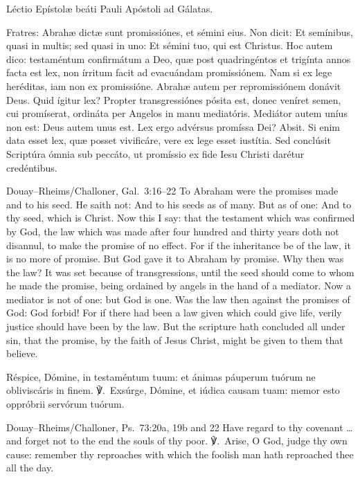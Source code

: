 Léctio Epístolæ beáti Pauli Apóstoli ad Gálatas.

Fratres: Abrahæ dictæ sunt promissiónes, et sémini eius. Non dicit: Et
semínibus, quasi in multis; sed quasi in uno: Et sémini tuo, qui est Christus.
Hoc autem dico: testaméntum confirmátum a Deo, quæ post quadringéntos et
trigínta annos facta est lex, non írritum facit ad evacuándam promissiónem.
Nam si ex lege heréditas, iam non ex promissióne. Abrahæ autem per
repromissiónem donávit Deus. Quid ígitur lex? Propter transgressiónes pósita
est, donec veníret semen, cui promíserat, ordináta per Angelos in manu
mediatóris. Mediátor autem uníus non est: Deus autem unus est. Lex ergo
advérsus promíssa Dei? Absit. Si enim data esset lex, quæ posset vivificáre,
vere ex lege esset iustítia. Sed conclúsit Scriptúra ómnia sub peccáto, ut
promíssio ex fide Iesu Christi darétur credéntibus.
\finishfulltextelement
\begin{fulltextenglish}{Douay--Rheims/Challoner, Gal.~3:16--22}
To Abraham were the promises made and to his seed. He saith not: And to his
seeds as of many. But as of one: And to thy seed, which is Christ. Now this I
say: that the testament which was confirmed by God, the law which was made
after four hundred and thirty years doth not disannul, to make the promise of
no effect. For if the inheritance be of the law, it is no more of promise.
But God gave it to Abraham by promise. Why then was the law? It was set
because of transgressions, until the seed should come to whom he made the
promise, being ordained by angels in the hand of a mediator. Now a mediator is
not of one: but God is one. Was the law then against the promises of God: God
forbid! For if there had been a law given which could give life, verily
justice should have been by the law. But the scripture hath concluded all
under sin, that the promise, by the faith of Jesus Christ, might be given to
them that believe.
\end{fulltextenglish}

Réspice, Dómine, in testaméntum tuum: et ánimas páuperum tuórum ne
obliviscáris in finem. ℣.~Exsúrge, Dómine, et iúdica causam tuam: memor esto
oppróbrii servórum tuórum.
\finishfulltextelement
\begin{fulltextenglish}{Douay--Rheims/Challoner, Ps.~73:20a, 19b and 22}
Have regard to thy covenant \dots{} and forget not to the end the souls of thy
poor. ℣.~Arise, O God, judge thy own cause: remember thy reproaches with which
the foolish man hath reproached thee all the day.
\end{fulltextenglish}

